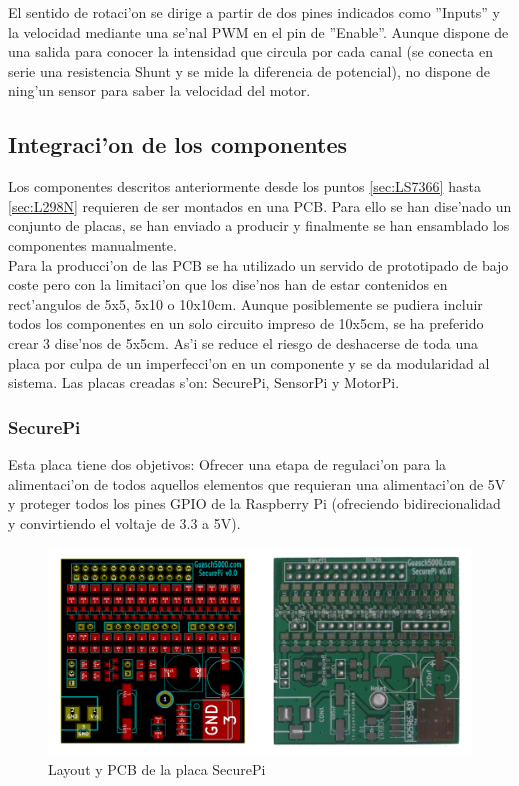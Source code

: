 \documentclass[twoside,12pt]{article}
\begin{document}
El sentido de rotaci'on se dirige a partir de dos pines indicados como ''Inputs'' y la velocidad mediante una se'nal PWM en el pin de ''Enable''. Aunque dispone de una salida para conocer la intensidad que circula por cada canal (se conecta en serie una resistencia Shunt y se mide la diferencia de potencial), no dispone de ning'un sensor para saber la velocidad del motor.

\subsection{Integraci'on de los componentes}
Los componentes descritos anteriormente desde los puntos \ref{sec:LS7366} hasta \ref{sec:L298N} requieren de ser montados en una PCB. Para ello se han dise'nado un conjunto de placas, se han enviado a producir y finalmente se han ensamblado los componentes manualmente.\\

Para la producci'on de las PCB se ha utilizado un servido de prototipado de bajo coste pero con la limitaci'on que los dise'nos han de estar contenidos en rect'angulos de 5x5, 5x10 o 10x10cm. Aunque posiblemente se pudiera incluir todos los componentes en un solo circuito impreso de 10x5cm, se ha preferido crear 3 dise'nos de 5x5cm. As'i se reduce el riesgo de deshacerse de toda una placa por culpa de un imperfecci'on en un componente y se da modularidad al sistema. Las placas creadas s'on: SecurePi, SensorPi y MotorPi.

\subsubsection{SecurePi}
Esta placa tiene dos objetivos: Ofrecer una etapa de regulaci'on para la alimentaci'on de todos aquellos elementos que requieran una alimentaci'on de 5V y proteger todos los pines GPIO de la Raspberry Pi (ofreciendo bidirecionalidad y convirtiendo el voltaje de 3.3 a 5V).

\begin{figure}[ht]
\centering
\includegraphics[scale=0.60]{images/SecurePi_comparation.png}
\caption{Layout y PCB de la placa SecurePi}
\label{fig:SecurePi_comparation}
\end{figure} 
\end{document}
